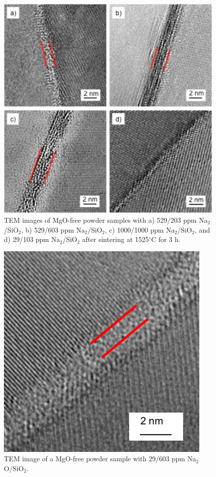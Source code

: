 \newpage
\begin{figure}[H]
	\centering
	\includegraphics[width=\textwidth]{Chapter-4/Figures/Figure10.png}
	\caption{TEM images of MgO-free powder samples with a) 529/203 ppm Na$_{2}$/SiO$_{2}$, b) 529/603 ppm Na$_{2}$/SiO$_{2}$, c) 1000/1000 ppm Na$_{2}$/SiO$_{2}$, and d) 29/103 ppm Na$_{2}$/SiO$_{2}$ after sintering at 1525$^{\circ}$C for 3 h.}
	\label{Ch4-figure:Figure10}
\end{figure}

\newpage
\begin{figure}[H]
	\centering
	\includegraphics[width=\textwidth]{Chapter-4/Figures/Figure11.png}
	\caption{TEM image of a MgO-free powder sample with 29/603 ppm Na$_{2}$O/SiO$_{2}$.}
	\label{Ch4-figure:Figure11}
\end{figure}

